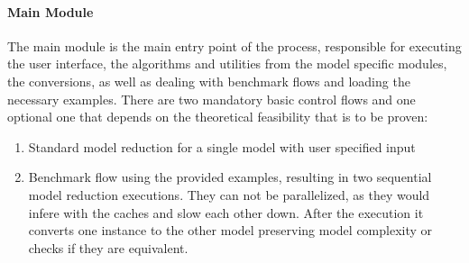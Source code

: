 			\paragraph{Main Module}
                The main module is the main entry point of the process, responsible for executing the user interface, the algorithms and utilities from the model specific modules, the conversions, as well as dealing with benchmark flows and loading the necessary examples. There are two mandatory basic control flows and one optional one that depends on the theoretical feasibility that is to be proven: 
                \begin{enumerate}
                    \item Standard model reduction for a single model with user specified input
                    \item Benchmark flow using the provided examples, resulting in two sequential model reduction executions. They can not be parallelized, as they would infere with the caches and slow each other down. After the execution it converts one instance to the other model preserving model complexity or checks if they are equivalent.
                \end{enumerate}


